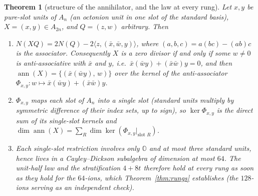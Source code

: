 \documentclass[11pt]{amsart}
\newtheorem{theorem}{Theorem}[section]
\theoremstyle{definition}
\begin{document}
\begin{theorem}[structure of the annihilator, and the law at every rung]\label{thm:structure}
Let $x,y$ be pure-slot units of $A_n$ (an octonion unit in one slot of the standard basis), $X=(x,y)\in A_{2n}$, and $Q=(z,w)$ arbitrary. Then
\begin{enumerate}
\item[(i)] $N(XQ)=2N(Q)-2\langle z,(\bar x,\bar w,y)\rangle$, where $(a,b,c)=a(bc)-(ab)c$ is the associator. Consequently $X$ is a zero divisor if and only if some $w\ne0$ is anti-associative with $\bar x$ and $y$, i.e.\ $\bar x(\bar w y)+(\bar x\bar w)y=0$, and then $\operatorname{ann}(X)=\{(\bar x(\bar wy),\,w)\}$ over the kernel of the anti-associator $\Phi_{x,y}\colon w\mapsto \bar x(\bar w y)+(\bar x\bar w)y$.
\item[(ii)] $\Phi_{x,y}$ maps each slot of $A_n$ into a single slot (standard units multiply by symmetric difference of their index sets, up to sign), so $\ker\Phi_{x,y}$ is the direct sum of its single-slot kernels and $\dim\operatorname{ann}(X)=\sum_R\dim\ker(\Phi_{x,y}|_{\text{slot }R})$.
\item[(iii)] Each single-slot restriction involves only $\mathbb O$ and at most three standard units, hence lives in a Cayley--Dickson subalgebra of dimension at most $64$. The unit-half law and the stratification $4+8t$ therefore hold at every rung as soon as they hold for the $64$-ions, which Theorem~\ref{thm:rungs} establishes (the $128$-ions serving as an independent check).
\end{enumerate}
\end{theorem}
\end{document}
